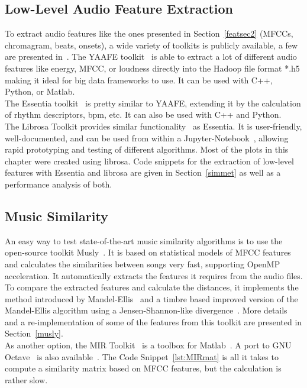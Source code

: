 \subsection{Low-Level Audio Feature Extraction}
To extract audio features like the ones presented in Section~\ref{featsec2} (MFCCs, chromagram, beats, onsets), a wide variety of toolkits is publicly available, a few are presented in~\cite{audiofeattoolb}.
The YAAFE toolkit~\cite{yaafe1} is able to extract a lot of different audio features like energy, MFCC, or loudness directly into the Hadoop file format *.h5 making it ideal for big data frameworks to use. It can be used with C++, Python, or Matlab.\\
The Essentia toolkit~\cite{essentia1} is pretty similar to YAAFE, extending it by the calculation of rhythm descriptors, bpm, etc. It can also be used with C++ and Python.\\
The Librosa Toolkit provides similar functionality~\cite{labrosa1} as Essentia. It is user-friendly, well-documented, and can be used from within a Jupyter-Notebook~\cite{jupyter}, allowing rapid prototyping and testing of different algorithms. Most of the plots in this chapter were created using librosa. Code snippets for the extraction of low-level features with Essentia and librosa are given in Section~\ref{simmet} as well as a performance analysis of both.\\

\subsection{Music Similarity}

An easy way to test state-of-the-art music similarity algorithms is to use the open-source toolkit Musly~\cite{musly1}. It is based on statistical models of MFCC features and calculates the similarities between songs very fast, supporting OpenMP acceleration. It automatically extracts the features it requires from the audio files. To compare the extracted features and calculate the distances, it implements the method introduced by Mandel-Ellis~\cite{mandelellis1} and a timbre based improved version of the Mandel-Ellis algorithm using a Jensen-Shannon-like divergence~\cite{musly2}. More details and a re-implementation of some of the features from this toolkit are presented in Section~\ref{musly}.\\
As another option, the MIR Toolkit~\cite{mirtoolbox1} is a toolbox for Matlab~\cite{matl1}. A port to GNU Octave~\cite{octave1} is also available~\cite{mirtoolbox2}. The Code Snippet~\ref{lst:MIRmat} is all it takes to compute a similarity matrix based on MFCC features, but the calculation is rather slow.

